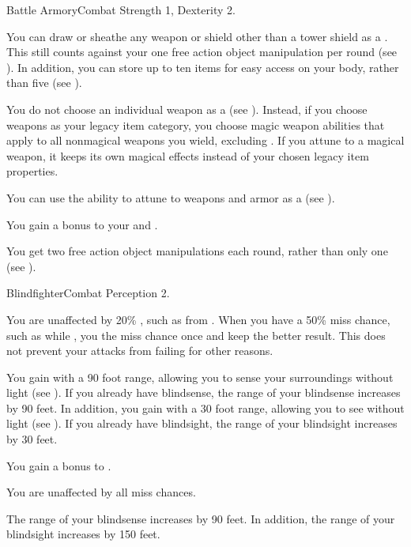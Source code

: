   \begin{feat}{Battle Armory}{Combat}
    \featpre Strength 1, Dexterity 2.

     You can draw or sheathe any weapon or shield other than a tower shield as a .
    This still counts against your one free action object manipulation per round (see ).
    In addition, you can store up to ten items for easy access on your body, rather than five (see ).

     You do not choose an individual weapon as a  (see ).
    Instead, if you choose weapons as your legacy item category, you choose magic weapon abilities that apply to all nonmagical weapons you wield, excluding .
    If you attune to a magical weapon, it keeps its own magical effects instead of your chosen legacy item properties.

     You can use the  ability to attune to weapons and armor as a  (see ).

     You gain a  bonus to your  and .

     You get two free action object manipulations each round, rather than only one (see ).
  \end{feat}

  \begin{feat}{Blindfighter}{Combat}
    \featpre Perception 2.

     You are unaffected by 20\% , such as from .
    When you have a 50\% miss chance, such as while \blinded, you  the miss chance once and keep the better result.
    This does not prevent your attacks from failing for other reasons.

     You gain  with a 90 foot range, allowing you to sense your surroundings without light (see ).
    If you already have blindsense, the range of your blindsense increases by 90 feet.
    In addition, you gain  with a 30 foot range, allowing you to see without light (see ).
    If you already have blindsight, the range of your blindsight increases by 30 feet.

     You gain a  bonus to .

     You are unaffected by all miss chances.

     The range of your blindsense increases by 90 feet.
    In addition, the range of your blindsight increases by 150 feet.
  \end{feat}

